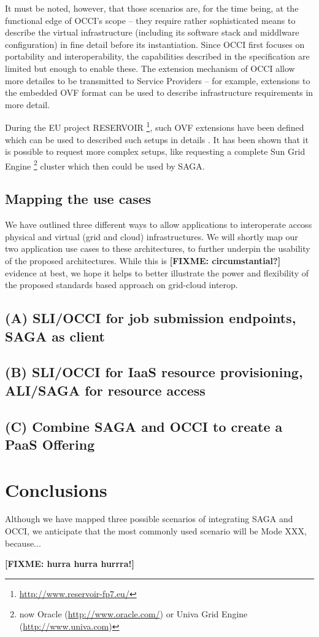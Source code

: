 \documentclass[10pt,conference,final,letterpaper,twoside,twocolumn,]{IEEEtran}
\newcommand{\B}[1]{\textbf{#1}}
\newcommand{\F}[1]{\B{[FIXME: #1]}}
\begin{document}
 It must be noted, however, that those scenarios are, for the time
 being, at the functional edge of OCCI's scope -- they require rather
 sophisticated means to describe the virtual infrastructure (including
 its software stack and middlware configuration) in fine detail before
 its instantiation. Since OCCI first focuses on portability and
 interoperability, the capabilities described in the specification are
 limited but enough to enable these. The extension mechanism of OCCI
 allow more detailes to be transmitted to Service Providers -- for
 example, extensions to the embedded OVF format can be used to describe
 infrastructure requirements in more detail.

 During the EU project RESERVOIR
 \footnote{\url{http://www.reservoir-fp7.eu/}}, such OVF extensions have been
 defined which can be used to described such setups in details
 \cite{comsware09}.  It has been shown that it is possible to request
 more complex setups, like requesting a complete Sun Grid Engine
 \footnote{now Oracle (\url{http://www.oracle.com/}) or Univa Grid
 Engine (\url{http://www.univa.com})} cluster which then could be used
 by SAGA.


 \subsection{Mapping the use cases}

 We have outlined three different ways to allow applications to
 interoperate accoss physical and virtual (grid and cloud)
 infrastructures.  We will shortly map our two application use cases
 to these architectures, to further underpin the usability of the
 proposed architectures.  While this is \F{circumstantial?} evidence
 at best, we hope it helps to better illustrate the power and
 flexibility of the proposed standards based approach on grid-cloud
 interop.

 \subsection{(A) SLI/OCCI for job submission endpoints, SAGA as client}

  

 \subsection{(B) SLI/OCCI for IaaS resource provisioning, ALI/SAGA for
 resource access} 
 \subsection{(C) Combine SAGA and OCCI to create a PaaS Offering}


\section{Conclusions}

Although we have mapped three possible scenarios of integrating SAGA
and OCCI, we anticipate that the most commonly used scenario will be
Mode XXX, because...


\label{sec:conc}

 \F{hurra hurra hurrra!}




\end{document}
